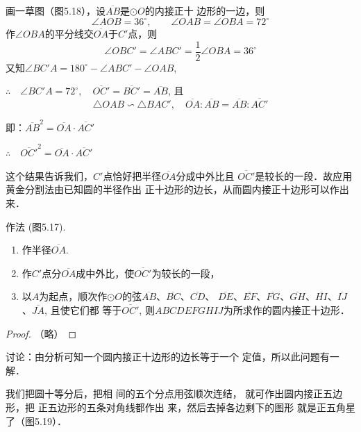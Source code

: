 \begin{analyze}
    画一草图（图5.18），设$\overline{AB}$是$\odot O$的内接正十
边形的一边，则
\[\angle AOB=36^{\circ},\qquad \angle OAB=\angle OBA=72^{\circ}\]
作$\angle OBA$的平分线交$\overline{OA}$于$C'$点，则
\[\angle OBC'=\angle ABC'=\frac{1}{2}\angle OBA=36^{\circ}\]
又知$\angle BC'A=180^{\circ}-\angle ABC'-\angle OAB$,

$\therefore\quad \angle BC'A=72^{\circ},\quad 
\overline{OC'}=\overline{BC'}=\overline{AB}$, 且
$$\triangle OAB\backsim \triangle BAC',\quad \overline{OA}:\overline{AB}=\overline{AB}:\overline{AC'}$$

即：$\overline{AB}^2=\overline{OA}\cdot \overline{AC'}$

$\therefore\quad \overline{OC'}^2=\overline{OA}\cdot \overline{AC'}$
\end{analyze}

这个结果告诉我们，$C'$点恰好把半径$\overline{OA}$分成中外比且
$\overline{OC'}$是较长的一段．故应用黄金分割法由已知圆的半径作出
正十边形的边长，从而圆内接正十边形可以作出来．

作法 (图5.17).
\begin{enumerate}
\item 作半径$\overline{OA}$.
\item 作$C'$点分$\overline{OA}$成中外比，使$\overline{OC'}$为较长的一段，
\item 以$A$为起点，顺次作$\odot O$的弦$\overline{AB}$、$\overline{BC}$、$\overline{CD}$、
$\overline{DE}$、$\overline{EF}$、$\overline{FG}$、$\overline{GH}$、$\overline{HI}$、$\overline{IJ}$、$\overline{JA}$, 且使它们都
等于$\overline{OC'}$, 则$ABCDEFGHIJ$为所求作的圆内接正十边形．
\end{enumerate}



\begin{proof}
    （略）
\end{proof}

讨论：由分析可知一个圆内接正十边形的边长等于一个
定值，所以此问题有一解．

我们把圆十等分后，把相
间的五个分点用弦顺次连结，
就可作出圆内接正五边形，把
正五边形的五条对角线都作出
来，然后去掉各边剩下的图形
就是正五角星了（图5.19）．


